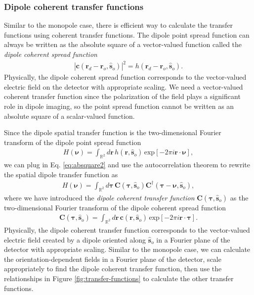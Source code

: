 \documentclass[]{osa-article}
\providecommand{\mb}[1]{\mathbf{#1}}
\providecommand{\ro}{\mathbf{\mathbf{r}}_o}
\providecommand{\so}{\mathbf{\hat{s}}_o}
\providecommand{\rd}{\mathbf{r}_d}
\providecommand{\mbb}[1]{\mathbb{#1}}
\providecommand{\bs}[1]{\boldsymbol{#1}}
\providecommand{\bv}{\bs{\nu}}
\providecommand{\taup}{\bs{\tau}}
\begin{document}
\subsubsection{Dipole coherent transfer functions}
Similar to the monopole case, there is efficient way to calculate the transfer
functions using coherent transfer functions. The dipole point spread function
can always be written as the absolute square of a vector-valued function called
the \textit{dipole coherent spread function}
\begin{align}
  |\mb{c}(\rd - \ro, \so)|^2 = h(\rd - \ro, \so). \label{eq:absquare2}
\end{align}
Physically, the dipole coherent spread function corresponds to the vector-valued
electric field on the detector with appropriate scaling. We need a vector-valued
coherent transfer function since the polarization of the field plays a
significant role in dipole imaging, so the point spread function cannot be
written as an absolute square of a scalar-valued function.

Since the dipole spatial transfer function is the two-dimensional
Fourier transform of the dipole point spread function
\begin{align}
  H(\bv) = \int_{\mbb{R}^2}d\mb{r}\,h(\mb{r}, \so)\,\text{exp}[-2\pi i\mb{r}\cdot\bv],
\end{align}
we can plug in Eq. \ref{eq:absquare2} and use the autocorrelation theorem to
rewrite the spatial dipole transfer function as 
\begin{align}
  H(\bv) = \int_{\mbb{R}^2}d\taup\,\mb{C}(\taup, \so)\mb{C}^\dagger(\taup - \bv, \so), 
\end{align}
where we have introduced the \textit{dipole coherent transfer function}
$\mb{C}(\taup, \so)$ as the two-dimensional Fourier transform of the dipole
coherent spread function
\begin{align}
  \mb{C}(\taup, \so) = \int_{\mbb{R}^2}d\mb{r}\, \mb{c}(\mb{r}, \so)\,\text{exp}[-2\pi i\mb{r}\cdot\taup].
\end{align}
Physically, the dipole coherent transfer function corresponds to the
vector-valued electric field created by a dipole oriented along $\so$ in a
Fourier plane of the detector with appropriate scaling. Similar to the monopole
case, we can calculate the orientation-dependent fields in a Fourier plane of
the detector, scale appropriately to find the dipole coherent transfer function,
then use the relationships in Figure \ref{fig:transfer-functions} to calculate
the other transfer functions. 
\end{document}
